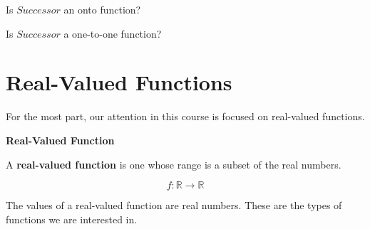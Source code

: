 \documentclass{ximera}
\begin{document}
\begin{question} 


Is $Successor$ an onto function?
\begin{multipleChoice}
\end{multipleChoice}
\end{question} 


\newpage

\begin{question} 


Is $Successor$ a one-to-one function?
\begin{multipleChoice}
\end{multipleChoice}
\end{question} 


























\section*{Real-Valued Functions}

For the most part, our attention in this course is focused on real-valued functions.




\begin{definition} \textbf{\textcolor{green!50!black}{Real-Valued Function}} 

A \textbf{real-valued function} is one whose range is a subset of the real numbers.

\[
f : \mathbb{R} \to \mathbb{R}
\]

\end{definition}

The values of a real-valued function are real numbers. These are the types of functions we are interested in.
\end{document}
